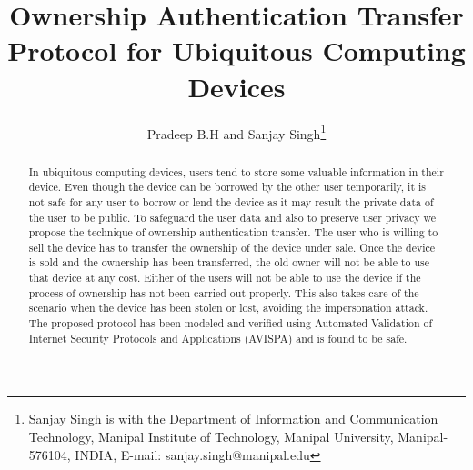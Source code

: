 \documentclass[letterpaper]{article}
\begin{document}
\title{Ownership Authentication Transfer Protocol for Ubiquitous Computing Devices}
\author{Pradeep B.H and Sanjay Singh\thanks {Sanjay Singh is with the Department of Information and Communication Technology, Manipal Institute of Technology, Manipal University, Manipal-576104, INDIA, E-mail: sanjay.singh@manipal.edu}}

\maketitle
\begin{abstract}
In ubiquitous computing devices, users tend to store some valuable information in their device. Even though the device can be borrowed by the other user temporarily, it is not safe for any user to borrow or lend the device as it may result the private data of the user to be public. To safeguard the user data and also to preserve user privacy we propose the technique of ownership authentication transfer. The user who is willing to sell the device has to transfer the ownership of the device under sale. Once the device is sold and the ownership has been transferred, the old owner will not be able to use that device at any cost. Either of the users will not be able to use the device if the process of ownership has not been carried out properly. This also takes care of the scenario when the device has been stolen or lost, avoiding the impersonation attack. The proposed protocol has been modeled and verified using Automated Validation of Internet Security Protocols and Applications (AVISPA) and is found to be safe.
\end{abstract}
\end{document}
